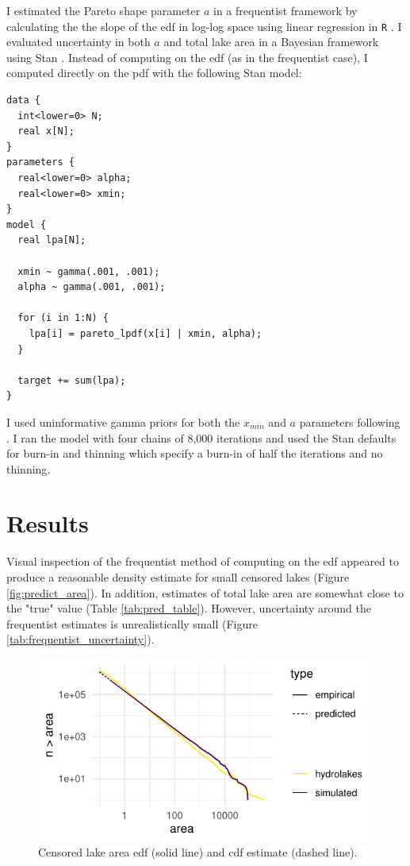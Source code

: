 \documentclass{article}
\begin{document}
I estimated the Pareto shape parameter $a$ in a frequentist framework by calculating the the slope of the edf in log-log space using linear regression in \texttt{R} \citep{team2013r}. I evaluated uncertainty in both $a$ and total lake area in a Bayesian framework using Stan \citep{standevelopmentteamStanModelingLanguage2017}. Instead of computing on the edf (as in the frequentist case), I computed directly on the pdf with the following Stan model:

\begin{minipage}[c]{0.95\textwidth}
	\begin{lstlisting}
data {
  int<lower=0> N;
  real x[N];
}
parameters {
  real<lower=0> alpha;
  real<lower=0> xmin;
}
model {
  real lpa[N];

  xmin ~ gamma(.001, .001);
  alpha ~ gamma(.001, .001);

  for (i in 1:N) {
    lpa[i] = pareto_lpdf(x[i] | xmin, alpha);
  }

  target += sum(lpa);
}
\end{lstlisting}
\end{minipage}

I used uninformative gamma priors for both the $x_{min}$ and $a$ parameters following \citet{scollnikCompositeLognormalParetoModels2007}. I ran the model with four chains of 8,000 iterations and used the Stan defaults for burn-in and thinning which specify a burn-in of half the iterations and no thinning.

\section{Results}

Visual inspection of the frequentist method of computing on the edf appeared to produce a reasonable density estimate for small censored lakes (Figure \ref{fig:predict_area}). In addition, estimates of total lake area are somewhat close to the "true" value (Table \ref{tab:pred_table}). However, uncertainty around the frequentist estimates is unrealistically small (Figure \ref{tab:frequentist_uncertainty}).

\begin{figure}
	\centering
	\includegraphics{figures/predict_censor-1}
	\caption{Censored lake area edf (solid line) and cdf estimate (dashed line).}
	\label{fig:predict_censor}
\end{figure}
\end{document}
